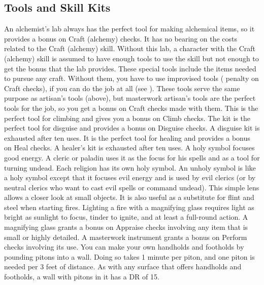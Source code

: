     \subsection{Tools and Skill Kits}
         An alchemist's lab always has the perfect tool for making alchemical items, so it provides a  bonus on Craft (alchemy) checks. It has no bearing on the costs related to the Craft (alchemy) skill. Without this lab, a character with the Craft (alchemy) skill is assumed to have enough tools to use the skill but not enough to get the  bonus that the lab provides.
         These special tools include the items needed to pursue any craft. Without them, you have to use improvised tools ( penalty on Craft checks), if you can do the job at all (see ).
         These tools serve the same purpose as artisan's tools (above), but masterwork artisan's tools are the perfect tools for the job, so you get a  bonus on Craft checks made with them.
         This is the perfect tool for climbing and gives you a  bonus on Climb checks.
         The kit is the perfect tool for disguise and provides a  bonus on Disguise checks. A disguise kit is exhausted after ten uses.
         It is the perfect tool for healing and provides a  bonus on Heal checks. A healer's kit is exhausted after ten uses.
         A holy symbol focuses good energy. A cleric or paladin uses it as the focus for his spells and as a tool for turning undead. Each religion has its own holy symbol.
         An unholy symbol is like a holy symbol except that it focuses evil energy and is used by evil clerics (or by neutral clerics who want to cast evil spells or command undead).
         This simple lens allows a closer look at small objects. It is also useful as a substitute for flint and steel when starting fires. Lighting a fire with a magnifying glass requires light as bright as sunlight to focus, tinder to ignite, and at least a full-round action. A magnifying glass grants a  bonus on Appraise checks
        involving any item that is small or highly detailed.
         A masterwork instrument grants a  bonus on Perform checks involving its use.
         You can make your own handholds and footholds by pounding pitons into a wall. Doing so takes 1 minute per piton, and one piton is needed per 3 feet of distance. As with any surface that offers handholds and footholds, a wall with pitons in it has a DR of 15.
